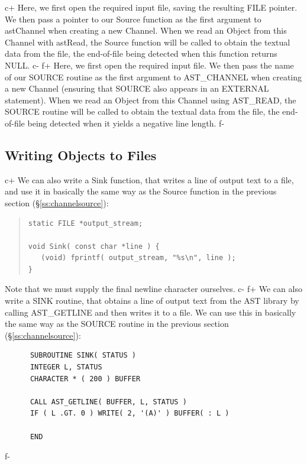\documentclass[twoside,11pt]{article}
\newcommand{\secref}[1]{\S\ref{#1}}
\newcommand{\secref}[1]{\ref{#1}}
\begin{document}
c+
Here, we first open the required input file, saving the resulting FILE
pointer. We then pass a pointer to our Source function as the first
argument to astChannel when creating a new Channel. When we read
an Object from this Channel with astRead, the Source
function will be called to obtain the textual data from the file, the
end-of-file being detected when this function returns NULL.
c-
f+
Here, we first open the required input file.  We then pass the name of
our SOURCE routine as the first argument to AST\_CHANNEL when creating
a new Channel (ensuring that SOURCE also appears in an EXTERNAL
statement). When we read an Object from this Channel using
AST\_READ, the SOURCE routine will be called to obtain the textual
data from the file, the end-of-file being detected when it yields a
negative line length.
f-

\subsection{\label{ss:channelsink}Writing Objects to Files}

c+
We can also write a Sink function, that writes a line of output text
to a file, and use it in basically the same way as the Source function
in the previous section (\secref{ss:channelsource}):

\begin{quote}
\small
\begin{verbatim}
static FILE *output_stream;

void Sink( const char *line ) {
   (void) fprintf( output_stream, "%s\n", line );
}
\end{verbatim}
\normalsize
\end{quote}

Note that we must supply the final newline character ourselves.
c-
f+
We can also write a SINK routine, that obtains a line of output text
from the AST library by calling AST\_GETLINE and then writes it to a
file. We can use this in basically the same way as the SOURCE routine
in the previous section (\secref{ss:channelsource}):

\small
\begin{verbatim}
      SUBROUTINE SINK( STATUS )
      INTEGER L, STATUS
      CHARACTER * ( 200 ) BUFFER

      CALL AST_GETLINE( BUFFER, L, STATUS )
      IF ( L .GT. 0 ) WRITE( 2, '(A)' ) BUFFER( : L )

      END
\end{verbatim}
\normalsize
f-
\end{document}
